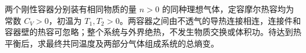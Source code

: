 两个刚性容器分别装有相同物质的量 $n>0$ 的同种理想气体，定容摩尔热容均为常数 $C_V>0$，初温为 $T_1,T_2>0$。两容器之间由不透气的导热连接相连，连接件和容器壁的热容可忽略；整个系统与外界绝热，不发生物质交换或体积功。待达到热平衡后，求最终共同温度及两部分气体组成系统的总熵变。
